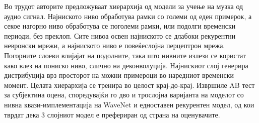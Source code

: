 Во трудот \cite{Mehri2016} авторите предложуваат хиерархија од модели за учење на музка од аудио сигнал. Најниското ниво обработува рамки со големи од еден примерок, а секое нагорно ниво обработува се поголеми рамки, или подолги временски периоди, без преклоп. Сите нивоа освен најниското се длабоки рекурентни невронски мрежи, а најниското ниво е повеќеслојна перцептрон мрежа. Погорните слоеви влијајат на подолните, така што нивните излези се користат како влез на пониско ниво, слично на деконволуција. Најнискиот слој генерира дистрибуција врз просторот на можни примероци во наредниот временски момент. Целата хиерархија се тренира во целост крај-до-крај. Извршиле AB тест за субјектина оцена, споредувајќи го дво и трослојна варијанта на моделот со нивна квази-имплементација на WaveNet \cite{Oord2016} и едноставен рекурентен модел, од кои тврдат дека 3 слојниот модел е префериран од страна на оценувачите.



